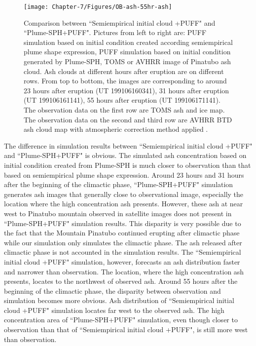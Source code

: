 \begin{figure}[!htb]
\begin{minipage}{.325 \textwidth}
    \end{minipage}%
    \begin{minipage}{.325 \textwidth}
        \centering
        \texttt{[image: Chapter-7/Figures/OB-ash-55hr-ash]}
    \end{minipage}%
    \caption{Comparison between ``Semiempirical initial cloud +PUFF" and ``Plume-SPH+PUFF". Pictures from left to right are: PUFF simulation based on initial condition created according semiempirical plume shape expression, PUFF simulation based on initial condition generated by Plume-SPH, TOMS or AVHRR image of Pinatubo ash cloud. Ash clouds at different hours after eruption are on different rows. From top to bottom, the images are corresponding to around 23 hours after eruption (UT 199106160341), 31 hours after eruption (UT 199106161141), 55 hours after eruption (UT 199106171141). The observation data on the first row are TOMS ash and ice map. The observation data on the second and third row are AVHRR BTD ash cloud map with atmospheric correction method applied \citep{guo2004particles}.}
    \label{fig:Plume-SPH-PUFF-ash-cloud}
\end{figure}

The difference in simulation results between ``Semiempirical initial cloud +PUFF" and ``Plume-SPH+PUFF" is obvious. The simulated ash concentration based on initial condition created from Plume-SPH is much closer to observation than that based on semiempirical plume shape expression. Around 23 hours and 31 hours after the beginning of the climactic phase, ``Plume-SPH+PUFF" simulation generates ash images that generally close to observational image, especially the location where the high concentration ash presents. However, these ash at near west to Pinatubo mountain observed in satellite images does not present in ``Plume-SPH+PUFF" simulation results. This disparity is very possible due to the fact that the Mountain Pinatubo continued erupting after climactic phase while our simulation only simulates the climactic phase. The ash released after climactic phase is not accounted in the simulation results. The ``Semiempirical initial cloud +PUFF" simulation, however, forecasts an ash distribution faster and narrower than observation. The location, where the high concentration ash presents, locates to the northwest of observed ash. 
Around 55 hours after the beginning of the climactic phase, the disparity between observation and simulation becomes more obvious. Ash distribution of ``Semiempirical initial cloud +PUFF" simulation locates far west to the observed ash. The high concentration area of ``Plume-SPH+PUFF" simulation, even though closer to observation than that of ``Semiempirical initial cloud +PUFF", is still more west than observation.

